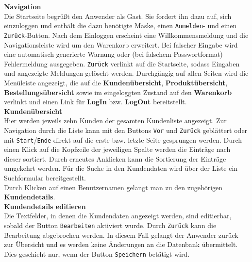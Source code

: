 \documentclass [a4paper]{article}
\begin{document}
\textbf{Navigation} \\
Die Startseite begrüßt den Anwender als Gast. Sie fordert ihn dazu auf, sich einzuloggen und
enthält die dazu benötigte Maske, einen \texttt{Anmelden}- und
einen \texttt{Zurück}-Button. Nach dem Einloggen erscheint eine Willkommensmeldung und die Navigationsleiste wird um den Warenkorb erweitert. Bei falscher
Eingabe wird eine automatisch generierte Warnung oder (bei falschem Passwortformat) Fehlermeldung ausgegeben. \texttt{Zurück} verlinkt auf die Startseite, sodass Eingaben und angezeigte Meldungen gelöscht werden. 
Durchgängig auf allen Seiten wird die Menüleiste angezeigt, die auf die \textbf{Kundenübersicht}, \textbf{Produktübersicht}, 
\textbf{Bestellungsübersicht} sowie im eingeloggten Zustand auf den \textbf{Warenkorb} verlinkt und einen Link für
\textbf{LogIn} bzw. \textbf{LogOut} bereitstellt.
\\


\noindent\textbf{Kundenübersicht}\\
Hier werden jeweils zehn Kunden der gesamten Kundenliste angezeigt. Zur Navigation durch die
Liste kann mit den Buttons \texttt{Vor} und \texttt{Zurück} geblättert oder mit
\texttt{Start}/\texttt{Ende} direkt auf die erste bzw. letzte Seite gesprungen werden.
Durch einen Klick auf die Kopfzeile der jeweiligen Spalte werden die Einträge
nach dieser sortiert. Durch erneutes Anklicken kann die Sortierung der Einträge
umgekehrt werden. Für die Suche in den Kundendaten wird über der Liste ein Suchformular bereitgestellt.\\
\noindent Durch Klicken auf einen Benutzernamen gelangt man zu den zugehörigen
\textbf{Kundendetails}.
\\




\noindent \textbf{Kundendetails editieren}\\
Die Textfelder, in denen die Kundendaten angezeigt werden, sind editierbar,
sobald der Button \texttt{Bearbeiten} aktiviert wurde.
Durch \texttt{Zurück} kann die Bearbeitung abgebrochen werden. In diesem Fall 
gelangt der Anwender zurück zur Übersicht und es
werden keine Änderungen an die Datenbank übermittelt.
Dies geschieht nur, wenn der Button \texttt{Speichern} betätigt wird.\\
\end{document}
